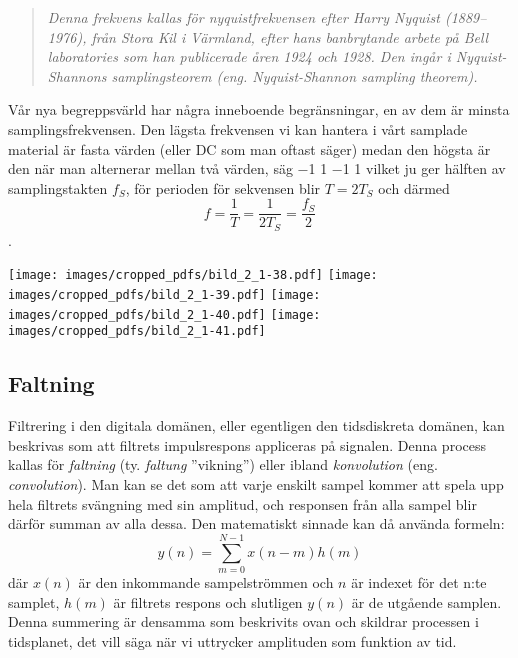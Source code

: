 \begin{quote}
\emph{Denna frekvens kallas för nyquistfrekvensen efter Harry Nyquist (1889--1976),
från Stora Kil i Värmland, efter hans banbrytande arbete på Bell laboratories
som han publicerade åren 1924 och 1928. Den ingår i \emph{Nyquist-Shannons
samplingsteorem} (eng. \emph{Nyquist-Shannon sampling theorem}).}
\end{quote}

\noindent
Vår nya begreppsvärld har några inneboende begränsningar, en av dem är minsta
samplingsfrekvensen.
Den lägsta frekvensen vi kan hantera i vårt samplade material är fasta värden
(eller DC som man oftast säger) medan den högsta är den när man alternerar
mellan två värden, säg \num{-1} \num{+1} \num{-1} \num{+1} vilket ju ger hälften
av samplingstakten \(f_S\), för perioden för sekvensen blir \(T = 2T_S\) och
därmed
\[f=\frac{1}{T}=\frac{1}{2T_S}=\frac{f_S}{2}\].

\begin{figure*}
\begin{center}
\texttt{[image: images/cropped\_pdfs/bild\_2\_1-38.pdf]}
\texttt{[image: images/cropped\_pdfs/bild\_2\_1-39.pdf]}
\texttt{[image: images/cropped\_pdfs/bild\_2\_1-40.pdf]}
\texttt{[image: images/cropped\_pdfs/bild\_2\_1-41.pdf]}
\caption{Sampling av DC; \qty{3,6}{\kilo\hertz}; \qty{12,4}{\kilo\hertz} och \qty{38}{\kilo\hertz} med \qty{40}{kS/s} samplingstakt}
\label{fig:BildII1-38}
\end{center}
\end{figure*}

\subsection{Faltning}

Filtrering i den digitala domänen, eller egentligen den tidsdiskreta domänen,
kan beskrivas som att filtrets impulsrespons appliceras på signalen. Denna
process kallas för \emph{faltning} (ty. \emph{faltung} ''vikning'') eller ibland
\emph{konvolution} (eng. \emph{convolution}).
Man kan se det som att varje enskilt sampel kommer att spela upp hela filtrets
svängning med sin amplitud, och responsen från alla sampel blir därför summan
av alla dessa.
Den matematiskt sinnade kan då använda formeln:
\[y(n) = \sum_{m=0}^{N-1} x(n-m)h(m)\]
där \(x(n)\) är den inkommande sampelströmmen och \(n\) är indexet för det
n:te samplet, \(h(m)\) är filtrets respons och slutligen \(y(n)\) är de utgående
samplen.
Denna summering är densamma som beskrivits ovan och skildrar processen
i tidsplanet, det vill säga när vi uttrycker amplituden som funktion av tid.

